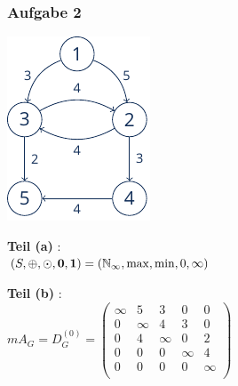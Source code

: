\documentclass{beamer}
\begin{document}
\begin{frame} \frametitle{Aufgabe 2}
	\begin{minipage}{\dimexpr0.4\linewidth-\fboxrule-\fboxsep}
		\includegraphics[width=\linewidth]{./tut12_task2-graph.pdf}
	\end{minipage}
	\pause
	\begin{minipage}{\dimexpr0.6\linewidth-\fboxrule-\fboxsep}
		\centering
		\textbf{Teil (a)} : \\
		$(S, \oplus, \odot, \mathbf{0}, \mathbf{1}) = (\mathbb{N}_\infty, \max, \min, 0, \infty)$
		
		\hspace{1em} \pause
		
		\textbf{Teil (b)} : \\
		$mA_G = D_G^{(0)} = \begin{pmatrix}
		\infty & 5      & 3      & 0      & 0 \\
		0      & \infty & 4      & 3      & 0 \\
		0      & 4      & \infty & 0      & 2 \\
		0      & 0      & 0      & \infty & 4 \\
		0      & 0      & 0      & 0      & \infty \\
		\end{pmatrix}$	
	\end{minipage}
\end{frame}
\end{document}
